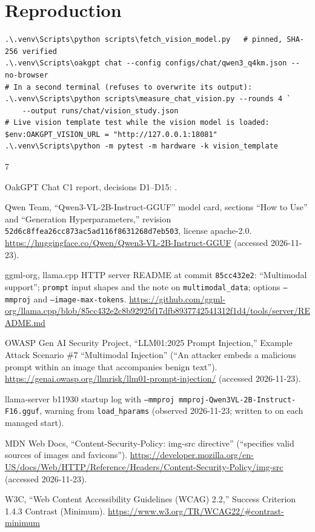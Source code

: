 \documentclass[11pt,a4paper]{article}
\newcommand{\code}[1]{\texttt{#1}}
\begin{document}
\section{Reproduction}

\begin{Verbatim}[fontsize=\footnotesize,frame=single,framesep=3mm]
.\.venv\Scripts\python scripts\fetch_vision_model.py   # pinned, SHA-256 verified
.\.venv\Scripts\oakgpt chat --config configs/chat/qwen3_q4km.json --no-browser
# In a second terminal (refuses to overwrite its output):
.\.venv\Scripts\python scripts\measure_chat_vision.py --rounds 4 `
    --output runs/chat/vision_study.json
# Live vision template test while the vision model is loaded:
$env:OAKGPT_VISION_URL = "http://127.0.0.1:18081"
.\.venv\Scripts\python -m pytest -m hardware -k vision_template
\end{Verbatim}

\begin{thebibliography}{7}
\small

 OakGPT Chat C1 report, decisions D1--D15: .

 Qwen Team, ``Qwen3-VL-2B-Instruct-GGUF'' model card, sections ``How to
  Use'' and ``Generation Hyperparameters,'' revision
  \code{52d6c8ffea26cc873ac5ad116f8631268d7eb503}, license apache-2.0.
  \url{https://huggingface.co/Qwen/Qwen3-VL-2B-Instruct-GGUF} (accessed 2026-11-23).

 ggml-org, llama.cpp HTTP server README at commit
  \code{85cc432e2}: ``Multimodal support''; \code{prompt}
  input shapes and the note on \code{multimodal\_data}; options \code{--mmproj} and
  \code{--image-max-tokens}.
  \url{https://github.com/ggml-org/llama.cpp/blob/85cc432e2c8b92925f17dfb8937742541312f1d4/tools/server/README.md}

 OWASP Gen AI Security Project, ``LLM01:2025 Prompt Injection,''
  Example Attack Scenario \#7 ``Multimodal Injection'' (``An attacker embeds a malicious
  prompt within an image that accompanies benign text'').
  \url{https://genai.owasp.org/llmrisk/llm01-prompt-injection/} (accessed 2026-11-23).

 llama-server b11930 startup log with
  \code{--mmproj mmproj-Qwen3VL-2B-Instruct-F16.gguf}, warning from \code{load\_hparams}
  (observed 2026-11-23; written to  on each
  managed start).

 MDN Web Docs, ``Content-Security-Policy: img-src directive''
  (``specifies valid sources of images and favicons'').
  \url{https://developer.mozilla.org/en-US/docs/Web/HTTP/Reference/Headers/Content-Security-Policy/img-src}
  (accessed 2026-11-23).

 W3C, ``Web Content Accessibility Guidelines (WCAG) 2.2,'' Success
  Criterion 1.4.3 Contrast (Minimum).
  \url{https://www.w3.org/TR/WCAG22/#contrast-minimum}

\end{thebibliography}
\end{document}
